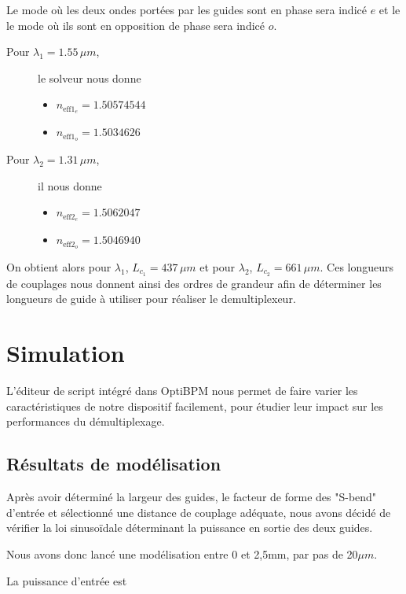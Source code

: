 \documentclass[a4paper,11pt]{report}
\begin{document}
Le mode où les deux ondes portées par les guides sont en phase sera indicé $e$ et le le mode où ils sont en opposition de phase sera indicé $o$. 
\begin{description}
    \item[Pour $\lambda_1=1.55\,\mu m$,] le solveur nous donne
    \begin{itemize}
        \item $n_{\text{eff}1_e}=1.50574544$
        \item $n_{\text{eff}1_o}=1.5034626$
    \end{itemize}
    \item[Pour $\lambda_2=1.31\,\mu m$,] il nous donne
    \begin{itemize}
        \item $n_{\text{eff}2_e}=1.5062047$
        \item $n_{\text{eff}2_o}=1.5046940$
    \end{itemize}
\end{description}

On obtient alors pour $\lambda_1$, $L_{c_1}=437\,\mu m$ et pour $\lambda_2$, $L_{c_2}=661\,\mu m$. Ces longueurs de couplages nous donnent ainsi des ordres de grandeur afin de déterminer les longueurs de guide à utiliser pour réaliser le demultiplexeur.

\chapter{Simulation} 

L'éditeur de script intégré dans OptiBPM nous permet de faire varier les caractéristiques de notre dispositif facilement, pour étudier leur impact sur les performances du démultiplexage.


\section{Résultats de modélisation}
Après avoir déterminé la largeur des guides, le facteur de forme des "S-bend" d'entrée et sélectionné une distance de couplage adéquate, nous avons décidé de vérifier la loi sinusoïdale déterminant la puissance en sortie des deux guides.

Nous avons donc lancé une modélisation entre 0 et 2,5mm, par pas de 20$\mu m$.

La puissance d'entrée est 
\end{document}

